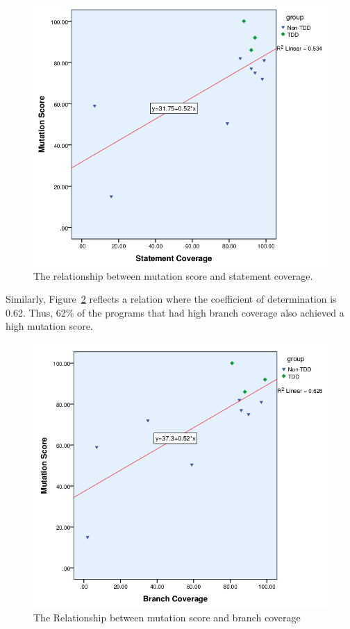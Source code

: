\documentclass[conference]{IEEEtran}
\begin{document}
\begin{figure}[t!]
\centering
\includegraphics[scale=.3]{benchmark_relation_mutationStatment.png}
\caption{The relationship between mutation score and statement coverage.}
\label{figure:benchmark_relation_mutationStatment}
\end{figure}
 
Similarly, Figure~\ref{figure:benchmark_relation_mutationBranch}  reflects a relation where the coefficient of determination is 0.62. Thus, 62\% of the programs that had high branch coverage also achieved a high mutation score.

\begin{figure}[t!]
\centering
\includegraphics[scale=.3]{benchmark_relation_mutationBranch.png}
\caption{The Relationship between mutation score and branch coverage}
\label{figure:benchmark_relation_mutationBranch}
\end{figure}
\end{document}
